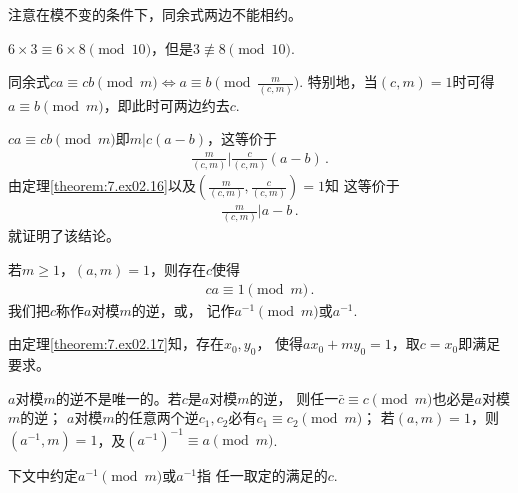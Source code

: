 
注意在模不变的条件下，同余式两边不能相约。
\begin{example}
    $6\times3\equiv6\times8\pmod{10}$，但是$3\not\equiv8\pmod{10}$.
\end{example}

\begin{theorem}\label{theorem:7.ex02.23}
    同余式$\displaystyle ca\equiv cb\pmod{m}\Leftrightarrow a\equiv b\pmod{\frac{m}{(c,m)}}$.
    特别地，当$(c,m)=1$时可得$a\equiv b\pmod{m}$，即此时可两边约去$c$.
\end{theorem}
\begin{prove}
    $ca\equiv cb\pmod{m}$即$m|c(a-b)$，这等价于
    \begin{align}
        \frac{m}{(c,m)}\bigg|\frac{c}{(c,m)}(a-b)\, .
    \end{align}
    由定理\ref{theorem:7.ex02.16}以及$\displaystyle\left(\frac{m}{(c,m)},\frac{c}{(c,m)}\right)=1$知
    这等价于
    \begin{align}
        \frac{m}{(c,m)}\bigg|a-b\, .
    \end{align}
    就证明了该结论。
\end{prove}
\begin{theorem}\label{theorem:7.ex02.24}
    若$m\ge1$，$(a,m)=1$，则存在$c$使得
    \begin{align}\label{eq:7.ex02.modularinverse}
        ca\equiv1\pmod{m}\, .
    \end{align}
    我们把$c$称作$a$对模$m$的逆，或，
    记作$a^{-1}\pmod{m}$或$a^{-1}$.
\end{theorem}
\begin{prove}
    由定理\ref{theorem:7.ex02.17}知，存在$x_0,y_0$，
    使得$ax_0+my_0=1$，取$c=x_0$即满足要求。
\end{prove}
$a$对模$m$的逆不是唯一的。若$c$是$a$对模$m$的逆，
则任一$\bar{c}\equiv c\pmod{m}$也必是$a$对模$m$的逆；
$a$对模$m$的任意两个逆$c_1,c_2$必有$c_1\equiv c_2\pmod{m}$；
若$(a,m)=1$，则$(a^{-1},m)=1$，及$(a^{-1})^{-1}\equiv a\pmod{m}$.
\begin{notation}
    下文中约定$a^{-1}\pmod{m}$或$a^{-1}$指
    任一取定的满足的$c$.
\end{notation}

